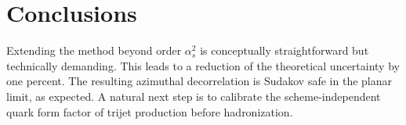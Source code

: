 \section{Conclusions}\label{sec:conclusions}

Extending the method beyond order $\alpha_s^2$ is conceptually
straightforward but technically demanding. This leads to a reduction of
the theoretical uncertainty by one percent. The resulting azimuthal
decorrelation is Sudakov safe in the planar limit, as expected. A
natural next step is to calibrate the scheme-independent quark form
factor of trijet production before hadronization.

